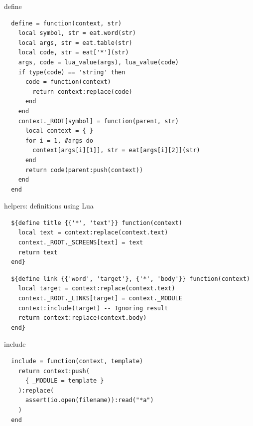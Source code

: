 \documentclass[aspectratio=43,handout,bigger]{beamer}
\begin{document}

\begin{frame}[fragile]{define}
\begin{verbatim}
  define = function(context, str)
    local symbol, str = eat.word(str)
    local args, str = eat.table(str)
    local code, str = eat['*'](str)
    args, code = lua_value(args), lua_value(code)
    if type(code) == 'string' then
      code = function(context)
        return context:replace(code)
      end
    end
    context._ROOT[symbol] = function(parent, str)
      local context = { }
      for i = 1, #args do
        context[args[i][1]], str = eat[args[i][2]](str)
      end
      return code(parent:push(context))
    end
  end
\end{verbatim}
\end{frame}


\begin{frame}[fragile]{helpers: definitions using Lua}
\begin{verbatim}
  ${define title {{'*', 'text'}} function(context)
    local text = context:replace(context.text)
    context._ROOT._SCREENS[text] = text
    return text
  end}
\end{verbatim}

\begin{verbatim}
  ${define link {{'word', 'target'}, {'*', 'body'}} function(context)
    local target = context:replace(context.text)
    context._ROOT._LINKS[target] = context._MODULE
    context:include(target) -- Ignoring result
    return context:replace(context.body)
  end}
\end{verbatim}
\end{frame}


\begin{frame}[fragile]{include}
\begin{verbatim}
  include = function(context, template)
    return context:push(
      { _MODULE = template }
    ):replace(
      assert(io.open(filename)):read("*a")
    )
  end
\end{verbatim}
\end{frame}

\end{document}
